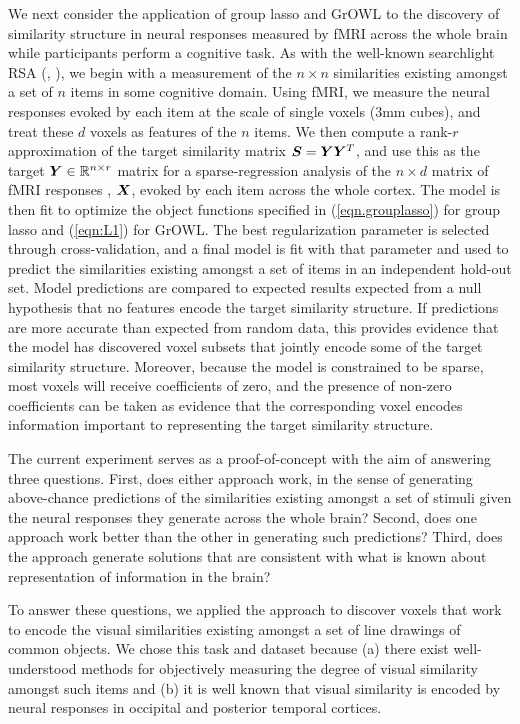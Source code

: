We next consider the application of group lasso and GrOWL to the discovery of similarity structure in neural responses measured by fMRI across the whole brain while participants perform a cognitive task. As with the well-known searchlight RSA (\cite{RSA}, \cite{similarity}), we begin with a measurement of the $n \times n $ similarities existing amongst a set of $n$ items in some cognitive domain.  Using fMRI, we measure the neural responses evoked by each item at the scale of single voxels (3mm cubes), and treat these $d$ voxels as features of the $n$ items. We then compute a rank-$r$ approximation of the target similarity matrix $\boldsymbol{S} = \boldsymbol{Y} \boldsymbol{Y}^T$, and use this as the target $\boldsymbol{Y} \in {\mathbb R}^{n \times r} $ matrix for a sparse-regression analysis of the $n \times d$ matrix of fMRI responses , $\boldsymbol{X}$,  evoked by each item across the whole cortex. The model is then fit to optimize the object functions specified in (\ref{eqn.grouplasso}) for group lasso and (\ref{eqn:L1}) for GrOWL. The best regularization parameter is selected through cross-validation, and a final model is fit with that parameter and used to predict the similarities existing amongst a set of items in an independent hold-out set. Model predictions are compared to expected results expected from a null hypothesis that no features encode the target similarity structure. If predictions are more accurate than expected from random data, this provides evidence that the model has discovered voxel subsets that jointly encode some of the target similarity structure. Moreover, because the model is constrained to be sparse, most voxels will receive coefficients of zero, and the presence of non-zero coefficients can be taken as evidence that the corresponding voxel encodes information important to representing the target similarity structure.

The current experiment serves as a proof-of-concept with the aim of answering three questions. First, does either approach work, in the sense of generating above-chance predictions of the similarities existing amongst a set of stimuli given the neural responses they generate across the whole brain? Second, does one approach work better than the other in generating such predictions? Third, does the approach generate solutions that are consistent with what is known about representation of information in the brain?

To answer these questions, we applied the approach to discover voxels that work to encode the visual similarities existing amongst a set of line drawings of common objects. We chose this task and dataset because (a) there exist well-understood methods for objectively measuring the degree of visual similarity amongst such items \cite{antani02} and (b) it is well known that visual similarity is encoded by neural responses in occipital and posterior temporal cortices.

